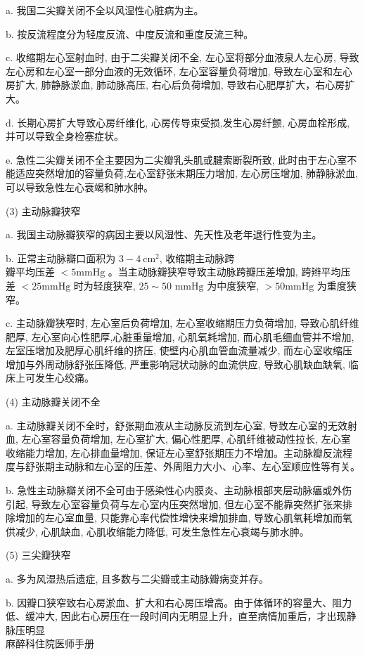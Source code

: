 \documentclass[10pt]{article}
\begin{document}
a. 我国二尖瓣关闭不全以风湿性心脏病为主。

b. 按反流程度分为轻度反流、中度反流和重度反流三种。

c. 收缩期左心室射血时, 由于二尖瓣关闭不全, 左心室将部分血液泉人左心房, 导致左心房和左心室一部分血液的无效循环, 左心室容量负荷增加, 导致左心室和左心房扩大, 肺静脉淤血, 肺动脉高压, 右心后负荷增加, 导致右心肥厚扩大，右心房扩大。

d. 长期心房扩大导致心房纤维化, 心房传导束受损,发生心房纤颤, 心房血栓形成, 并可以导致全身检塞症状。

e. 急性二尖瓣关闭不全主要因为二尖瓣乳头肌或腱索断裂所致, 此时由于左心室不能适应突然增加的容量负荷,左心室舒张末期压力增加, 左心房压增加, 肺静脉淤血, 可以导致急性左心衰竭和肺水肿。

(3) 主动脉瓣狭窄

a. 我国主动脉瓣狭窄的病因主要以风湿性、先天性及老年退行性变为主。

b. 正常主动脉瓣口面积为 $3-4 \mathrm{~cm}^{2}$, 收缩期主动脉跨\\
瓣平均压差 $<5 \mathrm{mmHg}$ 。当主动脉瓣狭窄导致主动脉跨瓣压差增加, 跨辫平均压差 $<25 \mathrm{mmHg}$ 时为轻度狭窄, $25 \sim 50$ $\mathrm{mmHg}$ 为中度狭窄, $>50 \mathrm{mmHg}$ 为重度狭窄。

c. 主动脉瓣狭窄时, 左心室后负荷增加, 左心室收缩期压力负荷增加, 导致心肌纤维肥厚, 左心室向心性肥厚,心脏重量增加, 心肌氧耗增加, 而心肌毛细血管并不增加,左室压增加及肥厚心肌纤维的挤压, 使壁内心肌血管血流量减少, 而左心室收缩压增加与外周动脉舒张压降低, 严重影响冠状动脉的血流供应, 导致心肌缺血缺氧, 临床上可发生心绞痛。

(4) 主动脉瓣关闭不全

a. 主动脉瓣关闭不全时，舒张期血液从主动脉反流到左心室, 导致左心室的无效射血, 左心室容量负荷增加, 左心室扩大, 偏心性肥厚, 心肌纤维被动性拉长, 左心室收缩能力增加, 左心排血量增加, 保证左心室舒张期压力不增加。主动脉瓣反流程度与舒张期主动脉和左心室的压差、外周阻力大小、心率、左心室顺应性等有关。

b. 急性主动脉瓣关闭不全可由于感染性心内膜炎、主动脉根部夹层动脉㿔或外伤引起, 导致左心室容量负荷与左心室内压突然增加, 但左心室不能靠突然扩张来排除增加的左心室血量, 只能靠心率代偿性增快来增加排血, 导致心肌氧耗增加而氧供减少, 心肌缺血, 心肌收缩能力降低, 可发生急性左心衰竭与肺水肿。

(5) 三尖瓣狭窄

a. 多为风湿热后遗症, 且多数与二尖瓣或主动脉瓣病变并存。

b. 因瓣口狭窄致右心房淤血、扩大和右心房压增高。由于体循环的容量大、阻力低、缓冲大, 因此右心房压在一段时间内无明显上升，直至病情加重后，才出现静脉压明显\\
麻醉科住院医师手册
\end{document}
